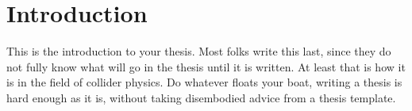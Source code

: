 \chapter{Introduction}
\label{ch:intro}

This is the introduction to your thesis. Most folks write this last, since they do not fully know what will go in the thesis until it is written. At least that is how it is in the field of collider physics. Do whatever floats your boat, writing a thesis is hard enough as it is, without taking disembodied advice from a thesis template.
